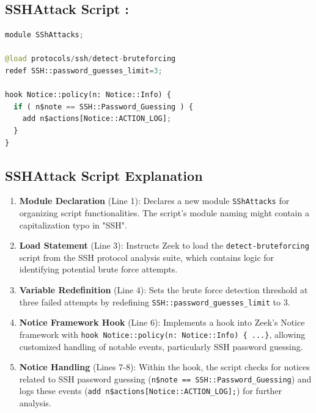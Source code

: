 \subsection{SSHAttack Script :}
\begin{lstlisting}[language=Python, caption=sshAttack.zeek]
module SShAttacks;

@load protocols/ssh/detect-bruteforcing
redef SSH::password_guesses_limit=3;

hook Notice::policy(n: Notice::Info) {
  if ( n$note == SSH::Password_Guessing ) {
    add n$actions[Notice::ACTION_LOG];
  }
}

\end{lstlisting}

\subsection{SSHAttack Script Explanation}

\begin{enumerate}
    \item \textbf{Module Declaration}  (Line 1): Declares a new module \texttt{SShAttacks} for organizing script functionalities. The script's module naming might contain a capitalization typo in "SSH".
    \item \textbf{Load Statement}   (Line 3): Instructs Zeek to load the \texttt{detect-bruteforcing} script from the SSH protocol analysis suite, which contains logic for identifying potential brute force attempts.
    \item \textbf{Variable Redefinition}   (Line 4): Sets the brute force detection threshold at three failed attempts by redefining \texttt{SSH::password\_guesses\_limit} to 3.
    \item \textbf{Notice Framework Hook} (Line 6): Implements a hook into Zeek's Notice framework with \texttt{hook Notice::policy(n: Notice::Info) \{ ...\}}, allowing customized handling of notable events, particularly SSH password guessing.
    \item \textbf{Notice Handling}   (Lines 7-8): Within the hook, the script checks for notices related to SSH password guessing (\texttt{n\$note == SSH::Password\_Guessing}) and logs these events (\texttt{add n\$actions[Notice::ACTION\_LOG];}) for further analysis.
\end{enumerate}

